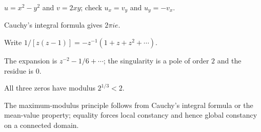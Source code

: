 \begin{selectedhints}
    \item $u=x^2-y^2$ and $v=2xy$; check $u_x=v_y$ and $u_y=-v_x$.
    \item Cauchy's integral formula gives $2\pi i e$.
    \item Write $1/[z(z-1)]=-z^{-1}(1+z+z^2+\cdots)$.
    \item The expansion is $z^{-2}-1/6+\cdots$; the singularity is a pole of order $2$ and the residue is $0$.
    \item All three zeros have modulus $2^{1/3}<2$.
    \item The maximum-modulus principle follows from Cauchy's integral formula or the mean-value property; equality forces local constancy and hence global constancy on a connected domain.
\end{selectedhints}
